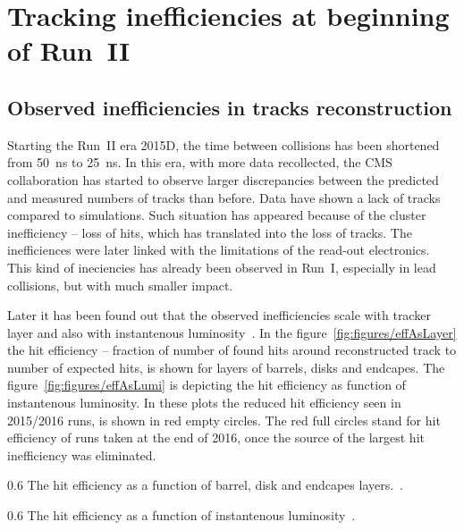 
\section{Tracking inefficiencies at beginning of Run~II}

\subsection{Observed inefficiencies in tracks reconstruction}

Starting the Run~II era 2015D, the time between collisions has been shortened from 50~ns to 25~ns. In this era, with more data recollected, the CMS collaboration has started to observe larger discrepancies between the predicted and measured numbers of tracks than before. Data have shown a lack of tracks compared to simulations. Such situation has appeared because of the cluster inefficiency -- loss of hits, which has translated into the loss of tracks. The inefficiences were later linked with the limitations of the read-out electronics. This kind of ineciencies has already been observed in Run~I, especially in lead collisions, but with much smaller impact. 

Later it has been found out that the observed inefficiencies scale with tracker layer and also with instantenous luminosity~\cite{website:hitEff}. In the figure~\ref{fig:figures/effAsLayer} the hit efficiency -- fraction of number of found hits around reconstructed track to number of expected hits, is shown for layers of barrels, disks and endcapes. The figure~\ref{fig:figures/effAsLumi} is depicting the hit efficiency  as function of instantenous luminosity. In these plots the reduced hit efficiency seen in 2015/2016 runs, is shown in red empty circles. The red full circles stand for hit efficiency of runs taken at the end of 2016, once the source of the largest hit inefficiency was eliminated.


                 {0.6}       %
                 {The hit efficiency as a function of barrel, disk and endcapes layers.~\cite{website:hitEff}.} %

                 {0.6}       %
                 {The hit efficiency as a function of instantenous luminosity~\cite{website:hitEff}.} %

